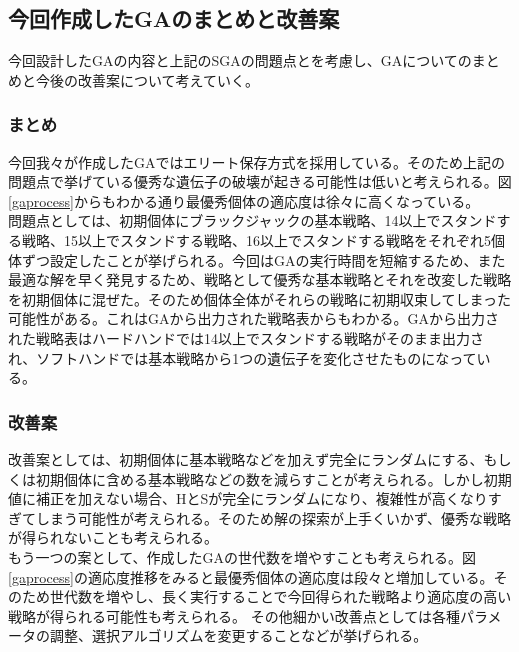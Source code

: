 \subsection{今回作成したGAのまとめと改善案}
今回設計したGAの内容と上記のSGAの問題点とを考慮し、GAについてのまとめと今後の改善案について考えていく。
\subsubsection{まとめ}
今回我々が作成したGAではエリート保存方式を採用している。そのため上記の問題点で挙げている優秀な遺伝子の破壊が起きる可能性は低いと考えられる。図\ref{gaprocess}からもわかる通り最優秀個体の適応度は徐々に高くなっている。\\
問題点としては、初期個体にブラックジャックの基本戦略、14以上でスタンドする戦略、15以上でスタンドする戦略、16以上でスタンドする戦略をそれぞれ5個体ずつ設定したことが挙げられる。今回はGAの実行時間を短縮するため、また最適な解を早く発見するため、戦略として優秀な基本戦略とそれを改変した戦略を初期個体に混ぜた。そのため個体全体がそれらの戦略に初期収束してしまった可能性がある。これはGAから出力された戦略表からもわかる。GAから出力された戦略表はハードハンドでは14以上でスタンドする戦略がそのまま出力され、ソフトハンドでは基本戦略から1つの遺伝子を変化させたものになっている。


\subsubsection{改善案}
改善案としては、初期個体に基本戦略などを加えず完全にランダムにする、もしくは初期個体に含める基本戦略などの数を減らすことが考えられる。しかし初期値に補正を加えない場合、HとSが完全にランダムになり、複雑性が高くなりすぎてしまう可能性が考えられる。そのため解の探索が上手くいかず、優秀な戦略が得られないことも考えられる。\\
もう一つの案として、作成したGAの世代数を増やすことも考えられる。図\ref{gaprocess}の適応度推移をみると最優秀個体の適応度は段々と増加している。そのため世代数を増やし、長く実行することで今回得られた戦略より適応度の高い戦略が得られる可能性も考えられる。
その他細かい改善点としては各種パラメータの調整、選択アルゴリズムを変更することなどが挙げられる。
